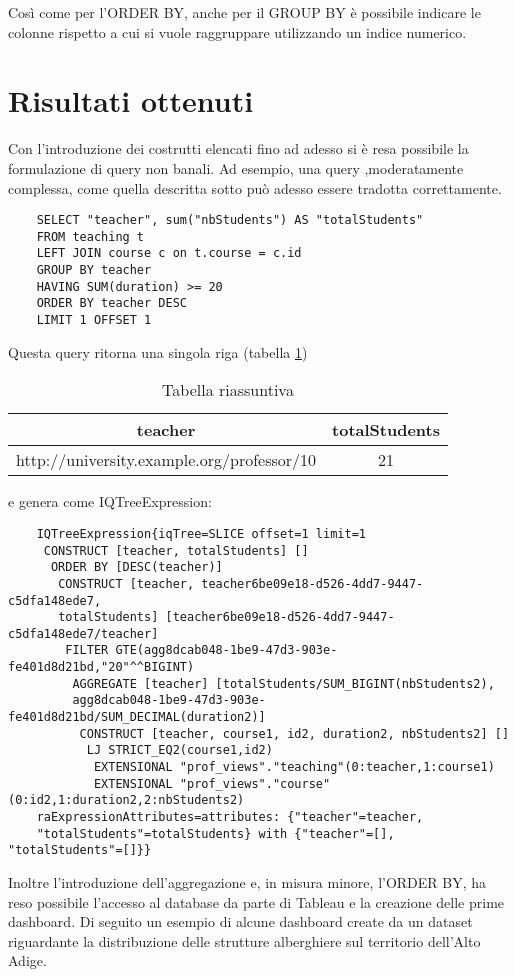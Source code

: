 Così come per l'ORDER BY, anche per il GROUP BY è possibile indicare le colonne rispetto a cui si vuole raggruppare utilizzando un indice numerico.

\section{Risultati ottenuti}
Con l'introduzione dei costrutti elencati fino ad adesso si è resa possibile la formulazione di query non banali. Ad esempio, una query ,moderatamente
complessa, come quella descritta sotto può adesso essere tradotta correttamente.
\begin{verbatim}
    SELECT "teacher", sum("nbStudents") AS "totalStudents"
    FROM teaching t 
    LEFT JOIN course c on t.course = c.id 
    GROUP BY teacher 
    HAVING SUM(duration) >= 20
    ORDER BY teacher DESC
    LIMIT 1 OFFSET 1
\end{verbatim}
Questa query ritorna una singola riga (tabella \ref{tab:complex})
\begin{table}[ht]
    \small
    \centering
    \caption{Tabella riassuntiva}
    \label{tab:complex}
    \begin{tabular}{| c | c | }
        \hline
        teacher                                    & totalStudents  \\ \hline
        http://university.example.org/professor/10 & 21             \\ \hline
    \end{tabular}
\end{table}
e genera come IQTreeExpression:
\begin{verbatim}
    IQTreeExpression{iqTree=SLICE offset=1 limit=1
     CONSTRUCT [teacher, totalStudents] []
      ORDER BY [DESC(teacher)]
       CONSTRUCT [teacher, teacher6be09e18-d526-4dd7-9447-c5dfa148ede7,
       totalStudents] [teacher6be09e18-d526-4dd7-9447-c5dfa148ede7/teacher]
        FILTER GTE(agg8dcab048-1be9-47d3-903e-fe401d8d21bd,"20"^^BIGINT)
         AGGREGATE [teacher] [totalStudents/SUM_BIGINT(nbStudents2), 
         agg8dcab048-1be9-47d3-903e-fe401d8d21bd/SUM_DECIMAL(duration2)]
          CONSTRUCT [teacher, course1, id2, duration2, nbStudents2] []
           LJ STRICT_EQ2(course1,id2)
            EXTENSIONAL "prof_views"."teaching"(0:teacher,1:course1)
            EXTENSIONAL "prof_views"."course"(0:id2,1:duration2,2:nbStudents2)
    raExpressionAttributes=attributes: {"teacher"=teacher, 
    "totalStudents"=totalStudents} with {"teacher"=[], "totalStudents"=[]}}
\end{verbatim}
Inoltre l'introduzione dell'aggregazione e, in misura minore, l'ORDER BY, ha reso possibile l'accesso al database da parte di Tableau e la creazione 
delle prime dashboard. Di seguito un esempio di alcune dashboard create da un dataset riguardante la distribuzione delle strutture alberghiere sul
territorio dell'Alto Adige.  

